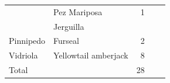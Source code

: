 \documentclass[11pt]{article}
\begin{document}
\begin{center}
\begin{tabular}{llrll}
                     &  Pez Mariposa          &          1  &           &          \\
                     &  Jerguilla             &             &           &          \\
\hline
 Pinnipedo           &  Furseal               &          2  &           &          \\
\hline
 Vidriola            &  Yellowtail amberjack  &          8  &           &          \\
\hline
 Total               &                        &         28  &           &          \\
\end{tabular}
\end{center}
\end{document}
